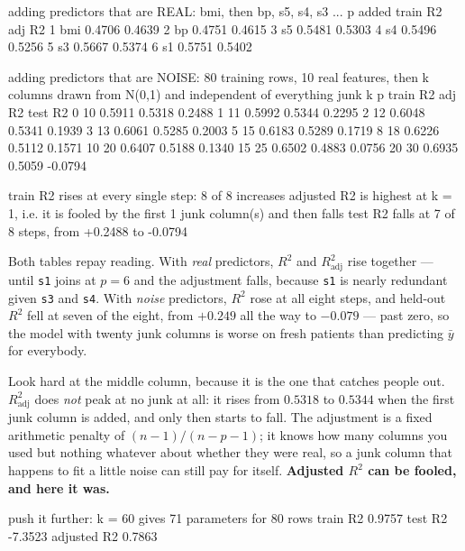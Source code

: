 \documentclass[11pt]{article}
\begin{document}
\begin{codeout}
adding predictors that are REAL: bmi, then bp, s5, s4, s3 ...
 p   added     train R2   adj R2
 1   bmi          0.4706   0.4639
 2   bp           0.4751   0.4615
 3   s5           0.5481   0.5303
 4   s4           0.5496   0.5256
 5   s3           0.5667   0.5374
 6   s1           0.5751   0.5402

adding predictors that are NOISE: 80 training rows, 10 real features,
then k columns drawn from N(0,1) and independent of everything
 junk k      p   train R2   adj R2    test R2
      0     10     0.5911   0.5318     0.2488
      1     11     0.5992   0.5344     0.2295
      2     12     0.6048   0.5341     0.1939
      3     13     0.6061   0.5285     0.2003
      5     15     0.6183   0.5289     0.1719
      8     18     0.6226   0.5112     0.1571
     10     20     0.6407   0.5188     0.1340
     15     25     0.6502   0.4883     0.0756
     20     30     0.6935   0.5059    -0.0794

train R2 rises at every single step: 8 of 8 increases
adjusted R2 is highest at k = 1, i.e. it is fooled by the first 1 junk column(s) and then falls
test R2 falls at 7 of 8 steps, from +0.2488 to -0.0794
\end{codeout}

Both tables repay reading. With \emph{real} predictors, $R^2$ and
$R^2_{\text{adj}}$ rise together --- until \texttt{s1} joins at $p=6$ and the
adjustment falls, because \texttt{s1} is nearly redundant given \texttt{s3}
and \texttt{s4}. With \emph{noise} predictors, $R^2$ rose at all eight steps,
and held-out $R^2$ fell at seven of the eight, from $+0.249$ all the way to
$\mathbf{-0.079}$ --- past zero, so the model with twenty junk columns is
worse on fresh patients than predicting $\bar y$ for everybody.

Look hard at the middle column, because it is the one that catches people out.
$R^2_{\text{adj}}$ does \emph{not} peak at no junk at all: it rises from
$0.5318$ to $0.5344$ when the first junk column is added, and only then starts
to fall. The adjustment is a fixed arithmetic penalty of
$(n-1)/(n-p-1)$; it knows how many columns you used but nothing whatever about
whether they were real, so a junk column that happens to fit a little noise
can still pay for itself. \textbf{Adjusted $R^2$ can be fooled, and here it
was.}

\begin{codeout}
push it further: k = 60 gives 71 parameters for 80 rows
   train R2 0.9757   test R2 -7.3523   adjusted R2 0.7863
\end{codeout}
\end{document}
